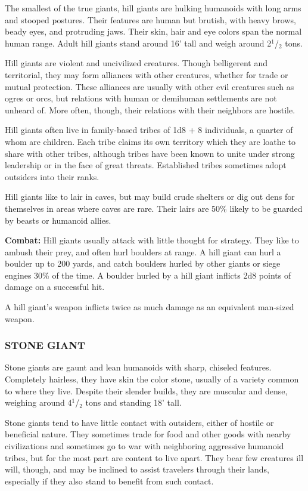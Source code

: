 \begin{multicols}{2}
The smallest of the true giants, hill giants are hulking humanoids with long arms and stooped postures. Their features are human but brutish, with heavy brows, beady eyes, and protruding jaws. Their skin, hair and eye colors span the normal human range. Adult hill giants stand around 16' tall and weigh around 2$^1$/$_2$ tons.

Hill giants are violent and uncivilized creatures. Though belligerent and territorial, they may form alliances with other creatures, whether for trade or mutual protection. These alliances are usually with other evil creatures such as ogres or orcs, but relations with human or demihuman settlements are not unheard of. More often, though, their relations with their neighbors are hostile.

Hill giants often live in family-based tribes of 1d8 + 8 individuals, a quarter of whom are children. Each tribe claims its own territory which they are loathe to share with other tribes, although tribes have been known to unite under strong leadership or in the face of great threats. Established tribes sometimes adopt outsiders into their ranks.

Hill giants like to lair in caves, but may build crude shelters or dig out dens for themselves in areas where caves are rare. Their lairs are 50\% likely to be guarded by beasts or humanoid allies.

\textbf{Combat:} Hill giants usually attack with little thought for strategy. They like to ambush their prey, and often hurl boulders at range. A hill giant can hurl a boulder up to 200 yards, and catch boulders hurled by other giants or siege engines 30\% of the time. A boulder hurled by a hill giant inflicts 2d8 points of damage on a successful hit.

A hill giant's weapon inflicts twice as much damage as an equivalent man-sized weapon.

\subsubsection{STONE GIANT}

Stone giants are gaunt and lean humanoids with sharp, chiseled features. Completely hairless, they have skin the color stone, usually of a variety common to where they live. Despite their slender builds, they are muscular and dense, weighing around 4$^1$/$_2$ tons and standing 18' tall.

Stone giants tend to have little contact with outsiders, either of hostile or beneficial nature. They sometimes trade for food and other goods with nearby civilizations and sometimes go to war with neighboring aggressive humanoid tribes, but for the most part are content to live apart. They bear few creatures ill will, though, and may be inclined to assist travelers through their lands, especially if they also stand to benefit from such contact.


\end{multicols}
